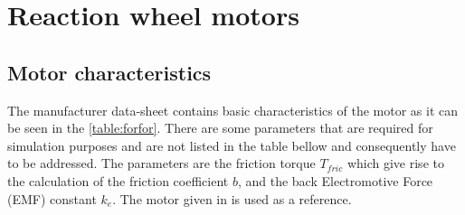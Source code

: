 \chapter{Reaction wheel motors}\label{chap: B}
%
\section{Motor characteristics}

The manufacturer data-sheet contains basic characteristics of the motor as it can be seen in the \ref{table:forfor}. There are some parameters that are required for simulation purposes and are not listed in the table bellow and consequently have to be addressed. The parameters are the friction torque $T_{fric}$ which give rise to the calculation of the friction coefficient $b$, and the back Electromotive Force (EMF) constant $k_{e}$. The motor given in \cite{motchar} is used as a reference.    
%
